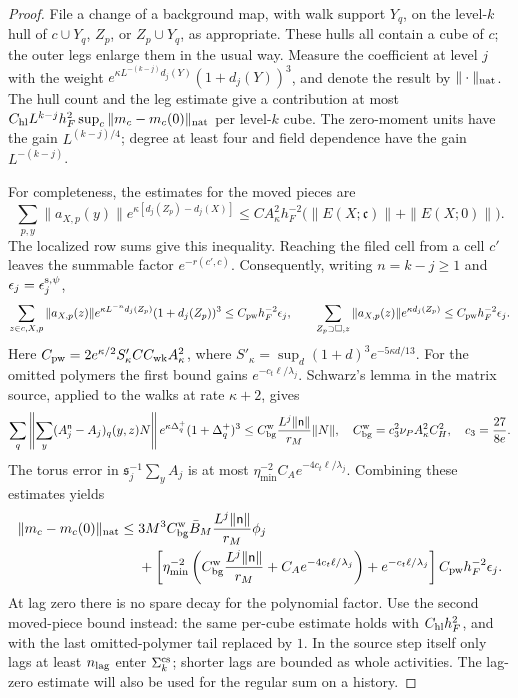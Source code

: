 \documentclass[11pt,letterpaper,reqno]{amsart}
\theoremstyle{definition}
\theoremstyle{remark}
\begin{document}
\begin{proof}
File a change of a background map, with walk support $Y_q$,
on the level-$k$ hull of $c\cup Y_q$, $Z_p$, or
$Z_p\cup Y_q$, as appropriate. These hulls all contain a cube
of $c$; the outer legs enlarge them in the usual way. Measure
the coefficient at level $j$ with the weight
$e^{\kappa L^{-(k-j)}d_j(Y)}(1+d_j(Y))^3$, and denote the
result by $\|\cdot\|_{\rm nat}$. The hull count and the leg
estimate give a contribution at most
$C_{\rm hl}L^{k-j}h_F^2\sup_c\|m_c-m_c(0)\|_{\rm nat}$
per level-$k$ cube. The zero-moment units have the gain
$L^{(k-j)/4}$; degree at least four and field dependence
have the gain $L^{-(k-j)}$.

For completeness, the estimates for the moved pieces are
\[
 \sum_{p,y}\|a_{X,p}(y)\|
       e^{\kappa[d_j(Z_p)-d_j(X)]}
 \le C A_\kappa^2h_F^{-2}
              \bigl(\|E(X;\mathfrak c)\|+\|E(X;0)\|\bigr).
\]
The localized row sums give this inequality. Reaching the filed
cell from a cell $c'$ leaves the summable factor $e^{-r(c',c)}$.
Consequently, writing $n=k-j\ge1$ and
$\epsilon_j=\epsilon_j^{{\rm s},\psi}$,
\begin{equation}\label{eq:qcd-moved-piece-bounds}
\begin{gathered}
 \sum_{z\in c,X,p}\|a_{X,p}(z)\|
       e^{\kappa L^{-n}d_j(Z_p)}(1+d_j(Z_p))^3
       \le C_{\rm pw}h_F^{-2}\epsilon_j,
 \qquad
 \sum_{Z_p\supset\square,z}\|a_{X,p}(z)\|
       e^{\kappa d_j(Z_p)}\le C_{\rm pw}h_F^{-2}\epsilon_j.
\end{gathered}
\end{equation}
Here
$C_{\rm pw}=2e^{\kappa/2}S'_\kappa C C_{\rm wk}A_\kappa^2$,
where $S'_\kappa=\sup_d(1+d)^3e^{-5\kappa d/13}$.
For the omitted polymers the first bound gains
$e^{-c_t\ell/\lambda_j}$. Schwarz's lemma in the matrix source,
applied to the walks at rate $\kappa+2$, gives
\[
 \sum_q\left\|\sum_y(A_j^{\mathsf n}-A_j)_q(y,z)N\right\|
       e^{\kappa\Delta_q^+}(1+\Delta_q^+)^3
 \le C_{\rm bg}^{\rm w}\frac{L^j\|\mathsf n\|}{r_M}\|N\|,
 \quad
 C_{\rm bg}^{\rm w}=c_3^2\nu_PA_\kappa^2C_H^2,
 \quad c_3=\frac{27}{8e}.
\]
The torus error in $\mathfrak s_j^{-1}\sum_y A_j$ is at most
$\eta_{\min}^{-2}C_Ae^{-4c_t\ell/\lambda_j}$. Combining these
estimates yields
\[
\begin{split}
 \|m_c-m_c(0)\|_{\rm nat}\le{}&
 3M^3 C_{\rm bg}^{\rm w}\bar B_M
                  \frac{L^j\|\mathsf n\|}{r_M}\phi_j\\
 &+\left[\eta_{\min}^{-2}
       \left(C_{\rm bg}^{\rm w}\frac{L^j\|\mathsf n\|}{r_M}
                    +C_Ae^{-4c_t\ell/\lambda_j}\right)
                    +e^{-c_t\ell/\lambda_j}\right]
                         C_{\rm pw}h_F^{-2}\epsilon_j.
\end{split}
\]
At lag zero there is no spare decay for the polynomial factor.
Use the second moved-piece bound instead: the same per-cube
estimate holds with $C_{\rm hl}h_F^2$, and with the last
omitted-polymer tail replaced by $1$. In the source step itself
only lags at least $n_{\rm lag}$ enter $\Sigma_k^{\rm cs}$;
shorter lags are bounded as whole activities. The lag-zero
estimate will also be used for the regular sum on a history.


\end{proof}
\end{document}
